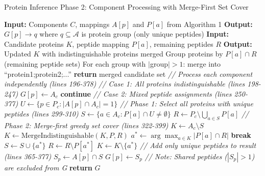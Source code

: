 \documentclass{article}
\begin{document}
\begin{algorithm}[t]
\caption{Protein Inference Phase 2: Component Processing with Merge-First Set Cover}
\begin{algorithmic}[1]
\State \textbf{Input:} Components $C$, mappings $A[p]$ and $P[a]$ from Algorithm 1
\State \textbf{Output:} $G[p] \to q$ where $q \subseteq \mathcal{A}$ is protein group (only unique peptides)
\State
{}
    \State \textbf{Input:} Candidate proteins $K$, peptide mapping $P[a]$, remaining peptides $R$
    \State \textbf{Output:} Updated $K$ with indistinguishable proteins merged
    \State Group proteins by $P[a] \cap R$ (remaining peptide sets)
    \State For each group with $|$group$| > 1$: merge into ``protein1;protein2;...''
    \State \textbf{return} merged candidate set
\EndFunction
\State
\State \textit{// Process each component independently (lines 196-378)}
    \State
    \State \textit{// Case 1: All proteins indistinguishable (lines 198-247)}
            \State $G[p] \gets A_c$ 
        \EndFor
        \State \textbf{continue}
    \EndIf
    \State
    \State \textit{// Case 2: Mixed peptide assignments (lines 250-377)}
    \State $U \gets \{p \in P_c : |A[p] \cap A_c| = 1\}$ 
    \State
    \State \textit{// Phase 1: Select all proteins with unique peptides (lines 299-310)}
    \State $S \gets \{a \in A_c : P[a] \cap U \neq \emptyset\}$ 
    \State $R \gets P_c \setminus \bigcup_{a \in S} P[a]$ 
    \State
    \State \textit{// Phase 2: Merge-first greedy set cover (lines 322-399)}
    \State $K \gets A_c \setminus S$ 
        \State $K \gets \text{MergeIndistinguishable}(K, P, R)$ 
        \State $a^* \gets \arg\max_{a \in K} |P[a] \cap R|$ 
            \State \textbf{break}
        \EndIf
        \State $S \gets S \cup \{a^*\}$ 
        \State $R \gets R \setminus P[a^*]$ 
        \State $K \gets K \setminus \{a^*\}$ 
    \EndWhile
    \State
    \State \textit{// Add only unique peptides to result (lines 365-377)}
        \State $S_p \gets A[p] \cap S$ 
            \State $G[p] \gets S_p$ 
        \EndIf
        \State \textit{// Note: Shared peptides ($|S_p| > 1$) are excluded from G}
    \EndFor
\EndFor
\State
\State \textbf{return} $G$
\end{algorithmic}
\end{algorithm}
\end{document}
